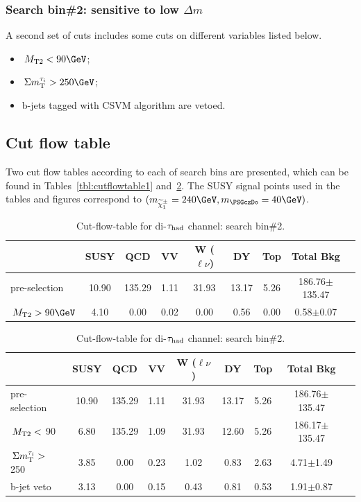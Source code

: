 \subsubsection{Search bin\#2: sensitive to low $\Delta m$}
A second set of cuts includes some cuts on different variables listed below.
\begin{itemize}
\item $\mttwo<90\GeV$;
\item $\SumMT>250\GeV$;
\item b-jets tagged with CSVM algorithm are vetoed.
\end{itemize}
\subsection{Cut flow table}
Two cut flow tables according to each of search bins are presented, which can be found in Tables~\ref{tbl:cutflowtable1} and~\ref{tbl:cutflowtable2}. The SUSY signal points used in the tables and figures correspond to $(m_{\chione}=240\GeV,m_{\PSGczDo}=40\GeV)$.   
\begin{table}
\begin{center}
\begin{tabular}{lcccccccc}
\hline\hline
  &SUSY&QCD&VV&W ($\ell\nu$)&DY&Top&Total Bkg&\\
\hline\hline
pre-selection &10.90&135.29&1.11&31.93&13.17&5.26&186.76$\pm$135.47&\\
$\mttwo>90\GeV$&4.10&0.00&0.02&0.00&0.56&0.00&0.58$\pm$0.07&\\
\hline\hline
\end{tabular}
\caption{Cut-flow-table for di-$\tau_{\rm had}$ channel: search bin\#1.}
\label{tbl:cutflowtable1}
\begin{tabular}{lcccccccc}
\hline\hline
  &SUSY&QCD&VV&W ($\ell\nu$)&DY&Top&Total Bkg&\\
\hline\hline
pre-selection &10.90&135.29&1.11&31.93&13.17&5.26&186.76$\pm$135.47&\\
$\,{M_{\rm T2}} < $ 90 &6.80&135.29&1.09&31.93&12.60&5.26&186.17$\pm$135.47&\\
$\,\Sigma m_{\rm T}^{\tau_i} > $ 250 &3.85&0.00&0.23&1.02&0.83&2.63&4.71$\pm$1.49&\\
b-jet veto &3.13&0.00&0.15&0.43&0.81&0.53&1.91$\pm$0.87&\\
\hline\hline
\end{tabular}
\caption{Cut-flow-table for di-$\tau_{\rm had}$ channel: search bin\#2.}
\label{tbl:cutflowtable2}
\end{center}
\end{table}
